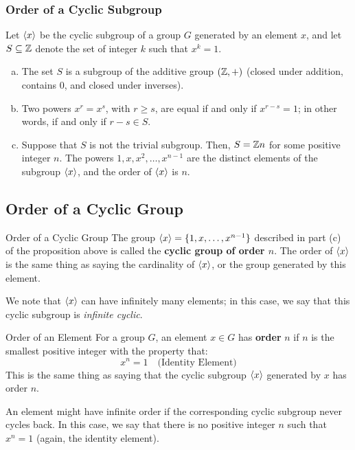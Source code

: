 \documentclass[letterpaper]{article}
\begin{document}
\subsubsection{Order of a Cyclic Subgroup}
\begin{mdframed}
    \begin{proposition}
        Let $\langle x \rangle$ be the cyclic subgroup of a group $G$ generated by an element $x$, and let $S \subseteq \mathbb{Z}$ denote the set of integer $k$ such that $x^k = 1$.
        \begin{enumerate}[(a)]
            \item The set $S$ is a subgroup of the additive group $(\mathbb{Z}, +)$ (closed under addition, contains 0, and closed under inverses). 
            \item Two powers $x^r = x^s$, with $r \geq s$, are equal if and only if $x^{r - s} = 1$; in other words, if and only if $r - s \in S$. 
            \item Suppose that $S$ is not the trivial subgroup. Then, $S = \mathbb{Z} n$ for some positive integer $n$. The powers $1, x, x^2, \dots, x^{n - 1}$ are the distinct elements of the subgroup $\langle x \rangle$, and the order of $\langle x \rangle$ is $n$. 
        \end{enumerate}
    \end{proposition}
\end{mdframed}

\subsection{Order of a Cyclic Group}
\begin{definition}{Order of a Cyclic Group}{}
    The group $\langle x \rangle = \{1, x, \dots, x^{n - 1}\}$ described in part (c) of the proposition above is called the \textbf{cyclic group of order $n$}. The order of $\langle x \rangle$ is the same thing as saying the cardinality of $\langle x \rangle$, or the group generated by this element. 
    
    \bigskip 
    
    We note that $\langle x \rangle$ can have infinitely many elements; in this case, we say that this cyclic subgroup is \emph{infinite cyclic}.
\end{definition}

\begin{definition}{Order of an Element}{}
    For a group $G$, an element $x \in G$ has \textbf{order} $n$ if $n$ is the smallest positive integer with the property that: 
    \[x^n = 1 \quad \text{(Identity Element)}\]
    This is the same thing as saying that the cyclic subgroup $\langle x \rangle$ generated by $x$ has order $n$. 
    
    \bigskip
    
    An element might have infinite order if the corresponding cyclic subgroup never cycles back. In this case, we say that there is no positive integer $n$ such that $x^n = 1$ (again, the identity element). 
\end{definition}
\end{document}
